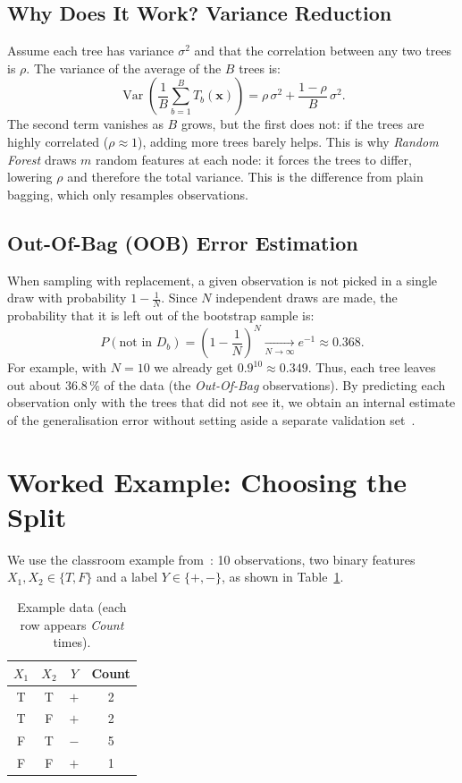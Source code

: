 \documentclass[12pt, a4paper]{article}
\begin{document}
\subsection{Why Does It Work? Variance Reduction}
Assume each tree has variance $\sigma^2$ and that the correlation between any two trees is $\rho$. The variance of the average of the $B$ trees is:
\begin{equation}
\operatorname{Var}\!\left( \frac{1}{B} \sum_{b=1}^{B} T_b(\mathbf{x}) \right)
= \rho\,\sigma^2 + \frac{1-\rho}{B}\,\sigma^2 .
\label{eq:variance}
\end{equation}
The second term vanishes as $B$ grows, but the first does not: if the trees are highly correlated ($\rho \approx 1$), adding more trees barely helps. This is why \textit{Random Forest} draws $m$ random features at each node: it forces the trees to differ, lowering $\rho$ and therefore the total variance. This is the difference from plain bagging, which only resamples observations.

\subsection{Out-Of-Bag (OOB) Error Estimation}
When sampling with replacement, a given observation is not picked in a single draw with probability $1 - \frac{1}{N}$. Since $N$ independent draws are made, the probability that it is left out of the bootstrap sample is:
\begin{equation}
P(\text{not in } D_b) = \left(1 - \frac{1}{N}\right)^{N}
\xrightarrow[N \to \infty]{} e^{-1} \approx 0.368 .
\label{eq:oob}
\end{equation}
For example, with $N=10$ we already get $0.9^{10} \approx 0.349$. Thus, each tree leaves out about 36.8\,\% of the data (the \textit{Out-Of-Bag} observations). By predicting each observation only with the trees that did not see it, we obtain an internal estimate of the generalisation error without setting aside a separate validation set~\cite{salman2024}.

\section{Worked Example: Choosing the Split}
We use the classroom example from~\cite{cs307}: 10 observations, two binary features $X_1, X_2 \in \{T, F\}$ and a label $Y \in \{+,-\}$, as shown in Table~\ref{tab:data}.

\begin{table}[htbp]
\centering
\caption{Example data (each row appears \textit{Count} times).}
\label{tab:data}
\begin{tabular}{cccc}
\toprule
$X_1$ & $X_2$ & $Y$ & \textbf{Count} \\
\midrule
T & T & $+$ & 2 \\
T & F & $+$ & 2 \\
F & T & $-$ & 5 \\
F & F & $+$ & 1 \\
\bottomrule
\end{tabular}
\end{table}
\end{document}
